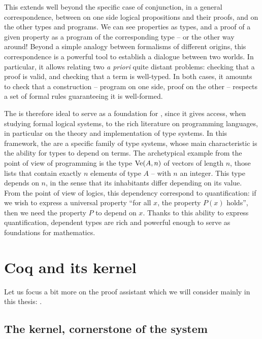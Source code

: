 This extends well beyond the specific case of conjunction, in a general correspondence,
between on one side logical propositions and their proofs, and on the other types and programs.
We can see properties as types, and a proof of a given property as a program of the
corresponding type – or the other way around!
Beyond a simple analogy between formalisms of different origins, this correspondence
is a powerful tool to establish a dialogue between two worlds. In particular, it
allows relating two \textit{a priori} quite distant problems: checking that a proof
is valid, and checking that a term is well-typed. In both cases, it amounts to check that
a construction – program on one side, proof on the other – respects a set of formal
rules guaranteeing it is well-formed.

The  is therefore ideal to serve as a foundation for
, since it gives access, when studying formal logical systems,
to the rich literature on programming languages, in particular on the theory and
implementation of type systems. In this framework, the
 are a specific family of type systems,
whose main characteristic is the ability for types to depend on terms. The archetypical
example from the point of view of programming is the type $\operatorname{Ve}(A,n)$
of vectors of length $n$, those lists that contain exactly $n$ elements of type $A$ – with
$n$ an integer.
This type depends on $n$, in the sense that its inhabitants differ depending on its value.
From the point of view of logics, this dependency correspond to quantification: if we
wish to express a universal property “for all $x$, the property $P(x)$ holds”, then we need
the property $P$ to depend on $x$.
Thanks to this ability to express quantification, dependent types are rich and powerful enough
to serve as foundations for mathematics.

\section{Coq and its kernel}
\label{sec:intro-coq-en}

Let us focus a bit more on the proof assistant which we will consider mainly in this
thesis: .

\subsection[The kernel]{The kernel, cornerstone of the system}

